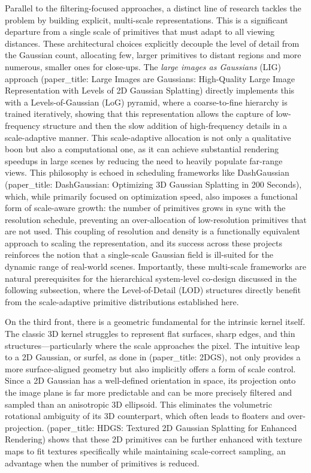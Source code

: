 \documentclass[11pt,a4paper]{article}
\begin{document}
Parallel to the filtering-focused approaches, a distinct line of research tackles the problem by building explicit, multi-scale representations. This is a significant departure from a single scale of primitives that must adapt to all viewing distances. These architectural choices explicitly decouple the level of detail from the Gaussian count, allocating few, larger primitives to distant regions and more numerous, smaller ones for close-ups. The \emph{large images as Gaussians} (LIG) approach (paper\_title: Large Images are Gaussians: High-Quality Large Image Representation with Levels of 2D Gaussian Splatting) directly implements this with a Levels-of-Gaussian (LoG) pyramid, where a coarse-to-fine hierarchy is trained iteratively, showing that this representation allows the capture of low-frequency structure and then the slow addition of high-frequency details in a scale-adaptive manner. This scale-adaptive allocation is not only a qualitative boon but also a computational one, as it can achieve substantial rendering speedups in large scenes by reducing the need to heavily populate far-range views. This philosophy is echoed in scheduling frameworks like DashGaussian (paper\_title: DashGaussian: Optimizing 3D Gaussian Splatting in 200 Seconds), which, while primarily focused on optimization speed, also imposes a functional form of scale-aware growth: the number of primitives grows in sync with the resolution schedule, preventing an over-allocation of low-resolution primitives that are not used. This coupling of resolution and density is a functionally equivalent approach to scaling the representation, and its success across these projects reinforces the notion that a single-scale Gaussian field is ill-suited for the dynamic range of real-world scenes. Importantly, these multi-scale frameworks are natural prerequisites for the hierarchical system-level co-design discussed in the following subsection, where the Level-of-Detail (LOD) structures directly benefit from the scale-adaptive primitive distributions established here.

On the third front, there is a geometric fundamental for the intrinsic kernel itself. The classic 3D kernel struggles to represent flat surfaces, sharp edges, and thin structures---particularly where the scale approaches the pixel. The intuitive leap to a 2D Gaussian, or surfel, as done in \cite{arxiv:2506.02751v3}(paper\_title: 2DGS), not only provides a more surface-aligned geometry but also implicitly offers a form of scale control. Since a 2D Gaussian has a well-defined orientation in space, its projection onto the image plane is far more predictable and can be more precisely filtered and sampled than an anisotropic 3D ellipsoid. This eliminates the volumetric rotational ambiguity of its 3D counterpart, which often leads to floaters and over-projection. \cite{arxiv:2504.13204v2}(paper\_title: HDGS: Textured 2D Gaussian Splatting for Enhanced Rendering) shows that these 2D primitives can be further enhanced with texture maps to fit textures specifically while maintaining scale-correct sampling, an advantage when the number of primitives is reduced.
\end{document}
